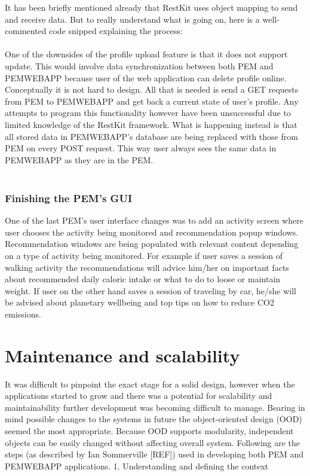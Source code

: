 \documentclass[12pt, a4paper]{report}   %
\begin{document}
\begin{enumerate}
It has been briefly mentioned already that RestKit uses object mapping to send and receive data. But to really understand what is going on, here is a well-commented code snipped explaining the process:\\ \\


One of the downsides of the profile upload feature is that it does not support update. This would involve data synchronization between both PEM and PEMWEBAPP because user of the web application can delete profile online. Conceptually it is not hard to design. All that is needed is send a GET requests from PEM to PEMWEBAPP and get back a current state of user's profile. Any attempts to program this functionality however have been unsuccessful due to limited knowledge of the RestKit framework. What is happening instead is that all stored data in PEMWEBAPP's database are being replaced with those from PEM on every POST request. This way user always sees the same data in PEMWEBAPP as they are in the PEM. \\ \\

\subsubsection{Finishing the PEM's GUI}
One of the last PEM's user interface changes was to add an activity screen where user chooses the activity being monitored and recommendation popup windows. Recommendation windows are being populated with relevant content depending on a type of activity being monitored. For example if user saves a session of walking activity the recommendations will advice him/her on important facts about recommended daily caloric intake or what to do to loose or maintain weight. If user on the other hand saves a session of traveling by car, he/she will be advised about planetary wellbeing and top tips on how to reduce CO2 emissions.


\section{Maintenance and scalability}
It was difficult to pinpoint the exact stage for a solid design, however when the applications started to grow and there was a potential for scalability and maintainability further development was becoming difficult to manage. Bearing in mind possible changes to the systems in future the object-oriented design (OOD) seemed the most appropriate. Because OOD supports modularity, independent objects can be easily changed without affecting overall system. Following are the steps (as described by Ian Sommerville [REF]) used in developing both PEM and PEMWEBAPP applications. 
1.	Understanding and defining the context\\ \\



\end{enumerate}
\end{document}
